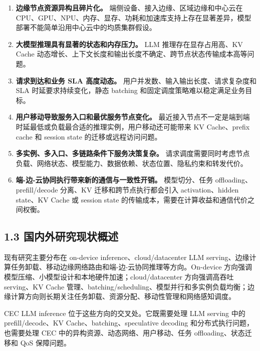 \documentclass[a4paper,10pt]{ctexart}
\begin{document}
\begin{enumerate}
\item \textbf{边缘节点资源异构且碎片化。} 端侧设备、接入边缘、区域边缘和中心云在 CPU、GPU、NPU、内存、显存、功耗和加速库支持上存在显著差异，模型部署不能简单沿用中心云中的均质集群假设。

\item \textbf{大模型推理具有显著的状态和内存压力。} LLM 推理存在显存占用高、KV Cache 动态增长、上下文长度和输出长度不确定、跨节点状态传输成本高等问题。

\item \textbf{请求到达和业务 SLA 高度动态。} 用户并发数、输入输出长度、请求复杂度和 SLA 时延要求持续变化，静态 batching 和固定调度策略难以稳定满足业务目标。

\item \textbf{用户移动导致服务入口和最优服务节点变化。} 最近接入节点不一定是端到端时延最低或负载最合适的推理实例，用户移动还可能带来 KV Cache、prefix cache 和 session state 的迁移或远程访问问题。

\item \textbf{多实例、多入口、多链路条件下服务决策复杂。} 请求调度需要同时考虑节点负载、网络状态、模型能力、数据依赖、状态位置、隐私约束和转发代价。

\item \textbf{端-边-云协同执行带来新的通信与一致性开销。} 模型切分、任务 offloading、prefill/decode 分离、KV 迁移和跨节点执行都会引入 activation、hidden state、KV Cache 或 session state 的传输成本，需要在计算收益和通信代价之间权衡。

\end{enumerate}


\subsection*{1.3 国内外研究现状概述}

现有研究主要分布在 on-device inference、cloud/datacenter LLM serving、边缘计算任务卸载、移动边缘网络路由和端-边-云协同推理等方向。On-device 方向强调模型压缩、小模型设计和本地硬件加速；cloud/datacenter 方向强调高吞吐 serving、KV Cache 管理、batching/scheduling、模型并行和多实例负载均衡；边缘计算方向则长期关注任务卸载、资源分配、移动性管理和网络感知调度。


CEC LLM inference 位于这些方向的交叉处。它既需要处理 LLM serving 中的 prefill/decode、KV Cache、batching、speculative decoding 和分布式执行问题，也需要处理 CEC 中的异构资源、动态网络、用户移动、任务 offloading、状态迁移和 QoS 保障问题。
\end{document}
